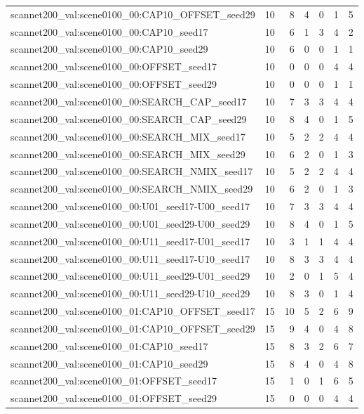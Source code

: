\begin{table}[t]
\begin{tabular}{lrrrrrr}
scannet200\_val:scene0100\_00:CAP10\_OFFSET\_seed29 & 10 & 8 & 4 & 0 & 1 & 5 \\
scannet200\_val:scene0100\_00:CAP10\_seed17 & 10 & 6 & 1 & 3 & 4 & 2 \\
scannet200\_val:scene0100\_00:CAP10\_seed29 & 10 & 6 & 0 & 0 & 1 & 1 \\
scannet200\_val:scene0100\_00:OFFSET\_seed17 & 10 & 0 & 0 & 0 & 4 & 4 \\
scannet200\_val:scene0100\_00:OFFSET\_seed29 & 10 & 0 & 0 & 0 & 1 & 1 \\
scannet200\_val:scene0100\_00:SEARCH\_CAP\_seed17 & 10 & 7 & 3 & 3 & 4 & 4 \\
scannet200\_val:scene0100\_00:SEARCH\_CAP\_seed29 & 10 & 8 & 4 & 0 & 1 & 5 \\
scannet200\_val:scene0100\_00:SEARCH\_MIX\_seed17 & 10 & 5 & 2 & 2 & 4 & 4 \\
scannet200\_val:scene0100\_00:SEARCH\_MIX\_seed29 & 10 & 6 & 2 & 0 & 1 & 3 \\
scannet200\_val:scene0100\_00:SEARCH\_NMIX\_seed17 & 10 & 5 & 2 & 2 & 4 & 4 \\
scannet200\_val:scene0100\_00:SEARCH\_NMIX\_seed29 & 10 & 6 & 2 & 0 & 1 & 3 \\
scannet200\_val:scene0100\_00:U01\_seed17-U00\_seed17 & 10 & 7 & 3 & 3 & 4 & 4 \\
scannet200\_val:scene0100\_00:U01\_seed29-U00\_seed29 & 10 & 8 & 4 & 0 & 1 & 5 \\
scannet200\_val:scene0100\_00:U11\_seed17-U01\_seed17 & 10 & 3 & 1 & 1 & 4 & 4 \\
scannet200\_val:scene0100\_00:U11\_seed17-U10\_seed17 & 10 & 8 & 3 & 3 & 4 & 4 \\
scannet200\_val:scene0100\_00:U11\_seed29-U01\_seed29 & 10 & 2 & 0 & 1 & 5 & 4 \\
scannet200\_val:scene0100\_00:U11\_seed29-U10\_seed29 & 10 & 8 & 3 & 0 & 1 & 4 \\
scannet200\_val:scene0100\_01:CAP10\_OFFSET\_seed17 & 15 & 10 & 5 & 2 & 6 & 9 \\
scannet200\_val:scene0100\_01:CAP10\_OFFSET\_seed29 & 15 & 9 & 4 & 0 & 4 & 8 \\
scannet200\_val:scene0100\_01:CAP10\_seed17 & 15 & 8 & 3 & 2 & 6 & 7 \\
scannet200\_val:scene0100\_01:CAP10\_seed29 & 15 & 8 & 4 & 0 & 4 & 8 \\
scannet200\_val:scene0100\_01:OFFSET\_seed17 & 15 & 1 & 0 & 1 & 6 & 5 \\
scannet200\_val:scene0100\_01:OFFSET\_seed29 & 15 & 0 & 0 & 0 & 4 & 4 \\

\end{tabular}
\end{table}
